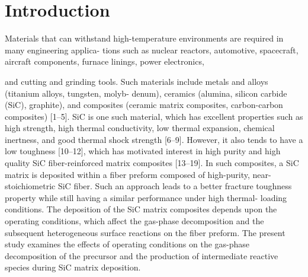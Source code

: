 \documentclass[10pt, letterpaper]{article}
\begin{document}
\noindent\hrulefill

\section{Introduction}
Materials that can withstand high-temperature environments are required in many engineering applica-
tions such as nuclear reactors, automotive, spacecraft, aircraft components, furnace linings, power electronics,
\pagebreak

\noindent and cutting and grinding tools. Such materials include metals and alloys (titanium alloys, tungsten, molyb-
denum), ceramics (alumina, silicon carbide (SiC), graphite), and composites (ceramic matrix composites,
carbon-carbon composites) [1–5]. SiC is one such material, which has excellent properties such as high
strength, high thermal conductivity, low thermal expansion, chemical inertness, and good thermal shock
strength [6–9]. However, it also tends to have a low toughness [10–12], which has motivated interest in high
purity and high quality SiC fiber-reinforced matrix composites [13–19]. In such composites, a SiC matrix is
deposited within a fiber preform composed of high-purity, near-stoichiometric SiC fiber. Such an approach
leads to a better fracture toughness property while still having a similar performance under high thermal-
loading conditions. The deposition of the SiC matrix composites depends upon the operating conditions,
which affect the gas-phase decomposition and the subsequent heterogeneous surface reactions on the fiber
preform. The present study examines the effects of operating conditions on the gas-phase decomposition of
the precursor and the production of intermediate reactive species during SiC matrix deposition.
\end{document}
